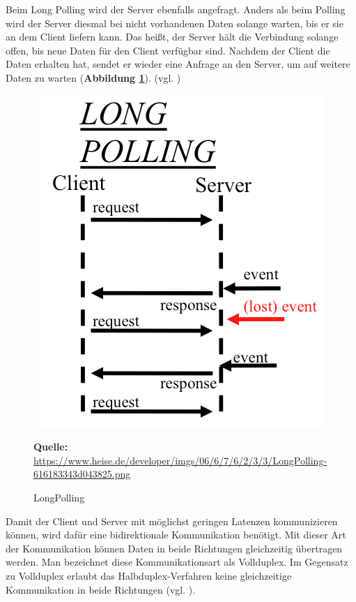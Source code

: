 Beim Long Polling wird der Server ebenfalls angefragt. Anders als beim Polling wird der Server diesmal bei nicht vorhandenen Daten solange warten, bis er sie an dem Client liefern kann. Das heißt, der Server hält die Verbindung solange offen, bis neue Daten für den Client verfügbar sind. Nachdem der Client die Daten erhalten hat, sendet er wieder eine Anfrage an den Server, um auf weitere Daten zu warten (\textbf{Abbildung \ref{fig:longPolling}}). (vgl. \cite{Mar2013})

\begin{figure}[H]
  \begin{center}
    \includegraphics[scale=0.4]{img/longPolling}
	\caption{LongPolling}
	\footnotesize\sffamily\textbf{Quelle:} \url{https://www.heise.de/developer/imgs/06/6/7/6/2/3/3/LongPolling-616183343d043825.png} 
	\label{fig:longPolling}
  \end{center}   
\end{figure}

\newpage
Damit der Client und Server mit möglichst geringen Latenzen kommunizieren können, wird dafür eine bidirektionale Kommunikation benötigt. Mit dieser Art der Kommunikation können Daten in beide Richtungen gleichzeitig übertragen werden. Man bezeichnet diese Kommunikationsart als Vollduplex. Im Gegensatz zu Vollduplex erlaubt das Halbduplex-Verfahren keine gleichzeitige Kommunikation in beide Richtungen (vgl. \cite{Wiki2018}).\bigskip

